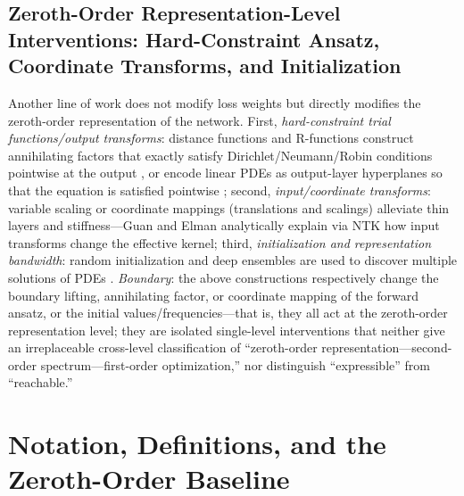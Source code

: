 \documentclass[11pt]{article}
\numberwithin{equation}{section}
\begin{document}
\subsection{Zeroth-Order Representation-Level Interventions: Hard-Constraint Ansatz, Coordinate Transforms, and Initialization}\label{sec:rel-repr}
Another line of work does not modify loss weights but directly modifies the zeroth-order representation of the network. First, \emph{hard-constraint trial functions/output transforms}: distance functions and R-functions construct annihilating factors that exactly satisfy Dirichlet/Neumann/Robin conditions pointwise at the output \cite{Sukumar2022distance}, or encode linear PDEs as output-layer hyperplanes so that the equation is satisfied pointwise \cite{Leng2022hyperplane}; second, \emph{input/coordinate transforms}: variable scaling or coordinate mappings (translations and scalings) alleviate thin layers and stiffness---Guan and Elman \cite{GuanElman2024} analytically explain via NTK how input transforms change the effective kernel; third, \emph{initialization and representation bandwidth}: random initialization and deep ensembles are used to discover multiple solutions of PDEs \cite{Zou2025ensemble}. \emph{Boundary}: the above constructions respectively change the boundary lifting, annihilating factor, or coordinate mapping of the forward ansatz, or the initial values/frequencies---that is, they all act at the zeroth-order representation level; they are isolated single-level interventions that neither give an irreplaceable cross-level classification of ``zeroth-order representation---second-order spectrum---first-order optimization,'' nor distinguish ``expressible'' from ``reachable.''

\FloatBarrier

\section{Notation, Definitions, and the Zeroth-Order Baseline}\label{sec:framework}
\end{document}
